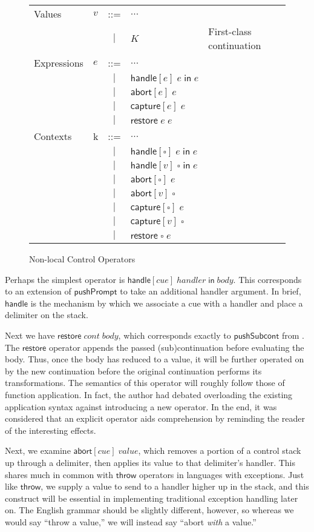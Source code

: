 \documentclass[11pt]{article}
\newcommand{\handle}[3]{\textsf{handle}[#1]\;#2\;\textsf{in}\;#3}
\newcommand{\abort}[2]{\textsf{abort}[#1]\;#2}
\newcommand{\capture}[2]{\textsf{capture}[#1]\;#2}
\newcommand{\pushSubcont}[2]{\textsf{restore}\;#1\;#2}
\begin{document}
\begin{figure}[h!]
\caption{Non-local Control Operators}
\label{fig:addControl}

\begin{tabular}{llcll}
Values & $v$ & ::= & $\ldots$ \\
& & $|$ & $K$ & First-class continuation \\
Expressions & $e$ & ::= & $\ldots$ \\
& & $|$ & $\handle{e}{e}{e}$ \\
& & $|$ & $\abort{e}{e}$ \\
& & $|$ & $\capture{e}{e}$ \\
& & $|$ & $\pushSubcont{e}{e}$ \\
Contexts & k & ::= & $\ldots$ \\
& & $|$ & $\handle{\square}{e}{e}$ \\
& & $|$ & $\handle{v}{\square}{e}$ \\
& & $|$ & $\abort{\square}{e}$ \\
& & $|$ & $\abort{v}{\square}$ \\
& & $|$ & $\capture{\square}{e}$ \\
& & $|$ & $\capture{v}{\square}$ \\
& & $|$ & $\pushSubcont{\square}{e}$ \\
\end{tabular}
\end{figure}

Perhaps the simplest operator is $\handle{cue}{handler}{body}$.
This corresponds to an extension of $\textsf{pushPrompt}$ to take an additional handler argument.
In brief, $\textsf{handle}$ is the mechanism by which we associate a cue with a handler and place a delimiter on the stack.

Next we have $\pushSubcont{cont}{body}$, which corresponds exactly to $\textsf{pushSubcont}$ from \cite{MFDC}.
The $\textsf{restore}$ operator appends the passed (sub)continuation before evaluating the body.
Thus, once the body has reduced to a value, it will be further operated on by the new continuation before the original continuation performs its transformations.
The semantics of this operator will roughly follow those of function application.
In fact, the author had debated overloading the existing application syntax against introducing a new operator.
In the end, it was considered that an explicit operator aids comprehension by reminding the reader of the interesting effects.

Next, we examine $\abort{cue}{value}$, which removes a portion of a control stack up through a delimiter, then applies its value to that delimiter's handler.
This shares much in common with $\textsf{throw}$ operators in languages with exceptions.
Just like $\textsf{throw}$, we supply a value to send to a handler higher up in the stack, and this construct will be essential in implementing traditional exception handling later on.
The English grammar should be slightly different, however, so whereas we would say ``throw a value,'' we will instead say ``abort \emph{with} a value.''
\end{document}
